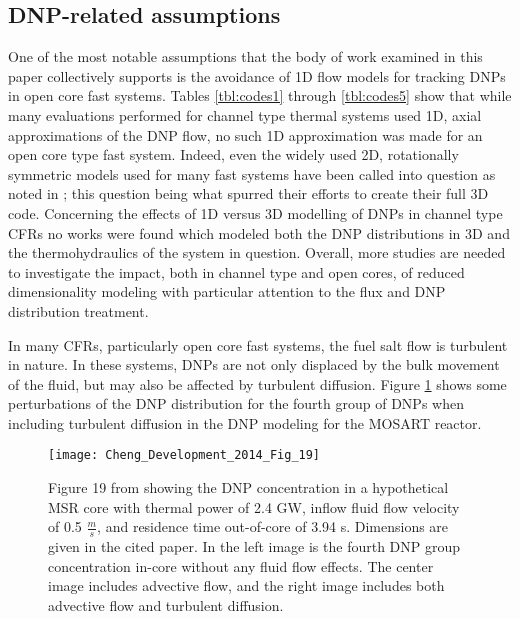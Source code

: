 \documentclass[review]{elsarticle}
\begin{document}
\subsection{DNP-related assumptions} \label{ssec:dnp_asm}
One of the most notable assumptions
that the body of work examined in this paper collectively supports is the
avoidance of 1D flow models for tracking DNPs in open core fast systems.
Tables \ref{tbl:codes1} through \ref{tbl:codes5}
 show that while many evaluations performed
for channel type thermal systems used 1D, axial approximations of the DNP
flow, no such 1D approximation was made for an open core type fast system.
Indeed, even the widely used 2D, rotationally symmetric models used for many
fast systems have been called into question as noted in
\cite{aufiero_development_2014}; this question being what spurred their efforts
to create their full 3D code. Concerning the effects of 1D versus 3D modelling
of DNPs in channel type CFRs no works were found
which modeled both the DNP distributions in 3D and the thermohydraulics of
the system in question. Overall, more studies are needed to investigate the
impact, both in channel type and open cores, of reduced dimensionality
modeling with particular attention to the flux and DNP distribution treatment.
\par In many CFRs, particularly open core fast systems, the fuel salt flow is
turbulent in nature. In these systems, DNPs are not only displaced by the
bulk movement of the fluid, but may also be affected by turbulent diffusion.
Figure \ref{fig:cheng_diffusion} shows some perturbations of the DNP
distribution for the fourth group of DNPs when including turbulent diffusion
in the DNP modeling for the MOSART reactor.

\begin{figure}[H]
   \centering
   \texttt{[image: Cheng\_Development\_2014\_Fig\_19]}
   \caption{Figure 19 from \cite{cheng_development_2014} showing the DNP
   concentration in a
   hypothetical MSR core with thermal power of 2.4 GW, inflow fluid flow
   velocity of 0.5
   $\frac{m}{s}$, and residence time out-of-core of 3.94 s. Dimensions are 
   given in the cited
   paper. In the left image is the fourth
   DNP group concentration in-core without any fluid flow effects. The center
   image
   includes advective flow, and the right image includes both advective flow and
   turbulent diffusion.} 
   \label{fig:cheng_diffusion}
\end{figure}
\end{document}
